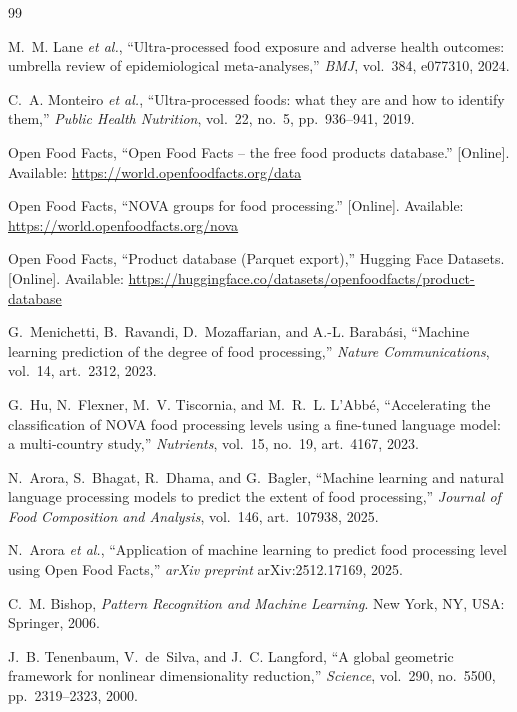 \documentclass[conference]{IEEEtran}
\begin{document}
\begin{thebibliography}{99}

M.~M. Lane \emph{et al.}, ``Ultra-processed food exposure and adverse health outcomes: umbrella review of epidemiological meta-analyses,'' \emph{BMJ}, vol.~384, e077310, 2024.

C.~A. Monteiro \emph{et al.}, ``Ultra-processed foods: what they are and how to identify them,'' \emph{Public Health Nutrition}, vol.~22, no.~5, pp.~936--941, 2019.

Open Food Facts, ``Open Food Facts -- the free food products database.'' [Online]. Available: \url{https://world.openfoodfacts.org/data}

Open Food Facts, ``NOVA groups for food processing.'' [Online]. Available: \url{https://world.openfoodfacts.org/nova}

Open Food Facts, ``Product database (Parquet export),'' Hugging Face Datasets. [Online]. Available: \url{https://huggingface.co/datasets/openfoodfacts/product-database}

G.~Menichetti, B.~Ravandi, D.~Mozaffarian, and A.-L. Barab\'asi, ``Machine learning prediction of the degree of food processing,'' \emph{Nature Communications}, vol.~14, art.~2312, 2023.

G.~Hu, N.~Flexner, M.~V. Tiscornia, and M.~R.~L. L'Abb\'e, ``Accelerating the classification of NOVA food processing levels using a fine-tuned language model: a multi-country study,'' \emph{Nutrients}, vol.~15, no.~19, art.~4167, 2023.

N.~Arora, S.~Bhagat, R.~Dhama, and G.~Bagler, ``Machine learning and natural language processing models to predict the extent of food processing,'' \emph{Journal of Food Composition and Analysis}, vol.~146, art.~107938, 2025.

N.~Arora \emph{et al.}, ``Application of machine learning to predict food processing level using Open Food Facts,'' \emph{arXiv preprint} arXiv:2512.17169, 2025.

C.~M. Bishop, \emph{Pattern Recognition and Machine Learning}. New York, NY, USA: Springer, 2006.

J.~B. Tenenbaum, V.~de~Silva, and J.~C. Langford, ``A global geometric framework for nonlinear dimensionality reduction,'' \emph{Science}, vol.~290, no.~5500, pp.~2319--2323, 2000.


\end{thebibliography}
\end{document}
